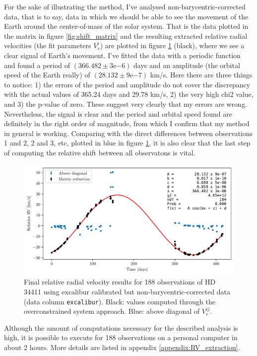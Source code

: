     For the sake of illustrating the method, I've analysed non-barycentric-corrected data, that is to say, data in which we should be able to see the movement of the Earth around the center-of-mass of the solar system. That is the data plotted in the matrix in figure \ref{fig:shift_matrix} and the resulting extracted relative radial velocities (the fit parameters $V_r^i$) are plotted in figure \ref{fig:RV_results_non_barycentric} (black), where we see a clear signal of Earth's movement. I've fitted the data with a periodic function and found a  period of $(366.482 \pm 3\mathrm{e}{-6})$ days and an amplitude (the orbital speed of the Earth really) of $(28.132 \pm 9\mathrm{e}{-7})$ km/s. Here there are three things to notice: 1) the errors of the period and amplitude do not cover the discrepancy with the actual values of 365.24 days and 29.78 km/s, 2) the very high chi2 value, and 3) the p-value of zero. These suggest very clearly that my errors are wrong. Nevertheless, the signal is clear and the period and orbital speed found are definitely in the right order of magnitude, from which I confirm that my method in general is working. Comparing with the direct differences between observations 1 and 2, 2 and 3, etc, plotted in blue in figure \ref{fig:RV_results_non_barycentric}, it is also clear that the last step of computing the relative shift between all observatons is vital. 

    \begin{figure}%
        \begin{wide}  
            \includegraphics[width=\textwidth]{figures/shift_non_bary_centric.pdf}
            \caption{Final relative radial velocity results for 188 observations of HD 34411 using excalibur calibrated but non-barycentric-corrected data (data column \texttt{excalibur}). Black: values computed through the overconstrained system approach. Blue: above diagonal of $V_r^{ij}$.}
            \label{fig:RV_results_non_barycentric}
        \end{wide}
    \end{figure}

    Although the amount of computations necessary for the described analysis is high, it is possible to execute for 188 observations on a personal computer in about 2 hours. More details are listed in appendix \ref{appendix:RV_extraction}.
    

